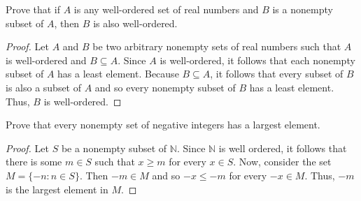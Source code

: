\documentclass[12pt]{article}
\newcommand{\N}{\mathbb{N}}
\newenvironment{problem}[2][Problem]{\begin{trivlist}
		\item[\hskip \labelsep {\bfseries #1}\hskip \labelsep {\bfseries #2.}]}{\end{trivlist}}
\begin{document}
	\begin{problem}{2}
		Prove that if $A$ is any well-ordered set of real numbers and $B$ is a nonempty subset of $A$, then $B$ is also well-ordered.
		\begin{proof}
			Let $A$ and $B$ be two arbitrary  nonempty sets of real numbers such that $A$ is well-ordered and $B\subseteq A$. Since $A$ is well-ordered, it follows that each nonempty subset of $A$ has a least element. Because $B\subseteq A$, it follows that every subset of $B$ is also a subset of $A$ and so every nonempty subset of $B$ has a least element. Thus, $B$ is well-ordered.
		\end{proof}
	\end{problem}

	\begin{problem}{3}
		Prove that every nonempty set of negative integers has a largest element.
		\begin{proof}
			Let $S$ be a nonempty subset of $\N$. Since $\N$ is well ordered, it follows that there is some $m\in S$ such that $x\geq m$ for every $x\in S$. Now, consider the set $M = \{-n:n\in S\}$. Then $-m\in M$ and so $-x\leq -m$ for every $-x\in M$. Thus, $-m$ is the largest element in $M$.
		\end{proof}
	\end{problem}
\end{document}
